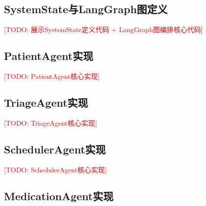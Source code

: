 \subsection{SystemState与LangGraph图定义}

\textcolor{red}{[TODO: 展示SystemState定义代码 + LangGraph图编排核心代码]}


\subsection{PatientAgent实现}

\textcolor{red}{[TODO: PatientAgent核心实现]}


\subsection{TriageAgent实现}

\textcolor{red}{[TODO: TriageAgent核心实现]}


\subsection{SchedulerAgent实现}

\textcolor{red}{[TODO: SchedulerAgent核心实现]}


\subsection{MedicationAgent实现}


